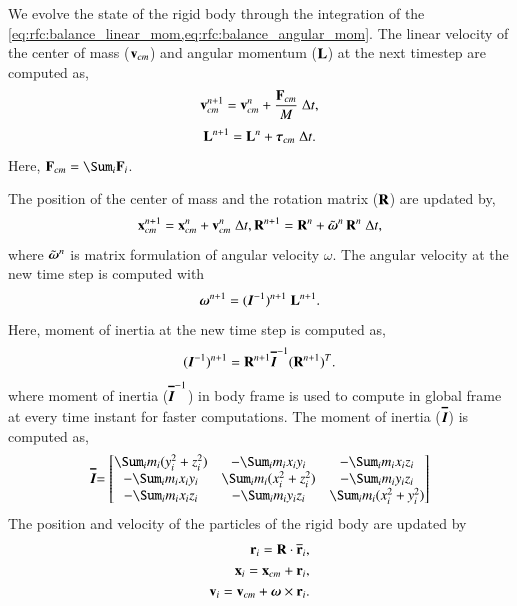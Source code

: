 We evolve the state of the rigid body through the integration of the
\cref{eq:rfc:balance_linear_mom,eq:rfc:balance_angular_mom}. The linear velocity of the
center of mass ($\mathbf{v}_{cm}$) and angular momentum ($\mathbf{L}$) at the next
timestep are computed as,
\begin{equation}
  \label{eq:rfc:lin_vel_cm_update}
  \mathbf{v}_{cm}^{n+1} = \mathbf{v}_{cm}^{n} + \frac{\mathbf{F}_{cm}}{M} \; \Delta t,
\end{equation}
\begin{equation}
  \label{eq:rfc:ang_mom_update}
  \mathbf{L}^{n+1} = \mathbf{L}^{n} + \boldsymbol{\tau}_{cm} \; \Delta t.
\end{equation}
Here, $\ten{F}_{cm} = \Sum_i \ten{F}_i$.

The position of the center of mass and the rotation matrix ($\mathbf{R}$) are updated
by,
\begin{equation}
  \label{eq:rfc:lin_pos_cm_update}
  \mathbf{x}_{cm}^{n+1} = \mathbf{x}_{cm}^{n} + \mathbf{v}_{cm}^{n} \; \Delta t,\\
  \mathbf{R}^{n+1} = \mathbf{R}^{n} + \tilde{\boldsymbol{\omega}}^{n} \, \mathbf{R}^{n} \; \Delta t,
\end{equation}
where $\tilde{\boldsymbol{\omega}}^{n}$ is matrix formulation of angular velocity
$\omega$. The angular velocity at the new time step is computed with
\begin{equation}
  \label{eq:rfc:ang_velocity_update}
  \boldsymbol{\omega}^{n+1} = (\textit{\ensuremath{\boldsymbol{I}}}^{-1})^{n+1} \; \mathbf{L}^{n+1}.
\end{equation}
Here, moment of inertia at the new time step is computed as,
\begin{equation}
  \label{eq:rfc:moi_update}
  (\textit{\ensuremath{\boldsymbol{I}}}^{-1})^{n+1} = \mathbf{R}^{n+1} \textit{\ensuremath{\boldsymbol{\overline{I}}}}^{-1} (\mathbf{R}^{n+1})^T.
\end{equation}
where moment of inertia ($\textit{\ensuremath{\boldsymbol{\overline{I}}}}^{-1}$) in body frame is
used to compute in global frame at every time instant for faster computations.
The moment of inertia ($\textit{\ensuremath{\boldsymbol{\overline{I}}}}$) is computed as,
\begin{equation*}
$\textit{\teng{\overline{I}}}$ =
\begin{bmatrix}
\Sum_i m_i (y_i^2 + z_i^2) & -\Sum_i m_i x_iy_i & -\Sum_i m_i x_iz_i\\
-\Sum_i m_i x_iy_i & \Sum_i m_i (x_i^2 + z_i^2) &  -\Sum_i m_i y_iz_i\\
-\Sum_i m_i  x_iz_i & -\Sum_i m_i y_iz_i & \Sum_i m_i (x_i^2 + y_i^2)
\end{bmatrix}
\end{equation*}
The position and velocity of the particles of the rigid body are updated by
\begin{eqnarray}
  \label{eq:rfc:rb_particle_pos_update}
  \mathbf{r}_i = \mathbf{R} \cdot \overline{\mathbf{r}}_{i},\\
  \mathbf{x}_i = \mathbf{x}_{cm} + \mathbf{r}_{i},\\
  \mathbf{v}_i = \mathbf{v}_{cm} + \boldsymbol{\omega} \times \mathbf{r}_{i}.
\end{eqnarray}

